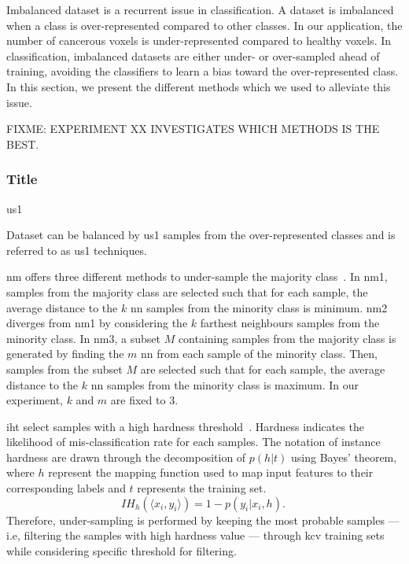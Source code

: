 \documentclass[a4paper,num-refs]{wiley-article}
\begin{document}
Imbalanced dataset is a recurrent issue in classification. A dataset is
imbalanced when a class is over-represented compared to other classes. In our
application, the number of cancerous voxels is under-represented compared to
healthy voxels. In classification, imbalanced datasets are either under- or
over-sampled ahead of training, avoiding the classifiers to learn a bias toward
the over-represented class. In this section, we present the different methods
which we used to alleviate this issue.

FIXME: EXPERIMENT XX INVESTIGATES WHICH METHODS IS THE BEST.

\subsubsection{Title}{\Acl*{us1}}

Dataset can be balanced by \ac{us1} samples from the over-represented classes
and is referred to as \ac{us1} techniques.

\Ac{nm} offers three different methods to under-sample the majority
class~\cite{mani2003knn}. In \ac{nm1}, samples from the majority class are
selected such that for each sample, the average distance to the $k$ \ac{nn}
samples from the minority class is minimum. \ac{nm2} diverges from \ac{nm1} by
considering the $k$ farthest neighbours samples from the minority class. In
\ac{nm3}, a subset $M$ containing samples from the majority class is generated
by finding the $m$ \ac{nn} from each sample of the minority class. Then,
samples from the subset $M$ are selected such that for each sample, the average
distance to the $k$ \ac{nn} samples from the minority class is maximum. In our
experiment, $k$ and $m$ are fixed to 3.

\Ac{iht} select samples with a high hardness
threshold~\cite{smith2014instance}. Hardness indicates the likelihood of
mis-classification rate for each samples. The notation of instance hardness
are drawn through the decomposition of $p(h \vert t)$ using Bayes' theorem,
where $h$ represent the mapping function used to map input features to their
corresponding labels and $t$ represents the training set.
\begin{equation}
  IH_h(\langle x_{i}, y_{i}\rangle) = 1 - p(y_i \vert x_i, h).\
  \label{eq:iht}
\end{equation}
Therefore, under-sampling is performed by keeping the most probable samples ---
i.e, filtering the samples with high hardness value --- through \ac{kcv}
training sets while considering specific threshold for filtering.
\end{document}
